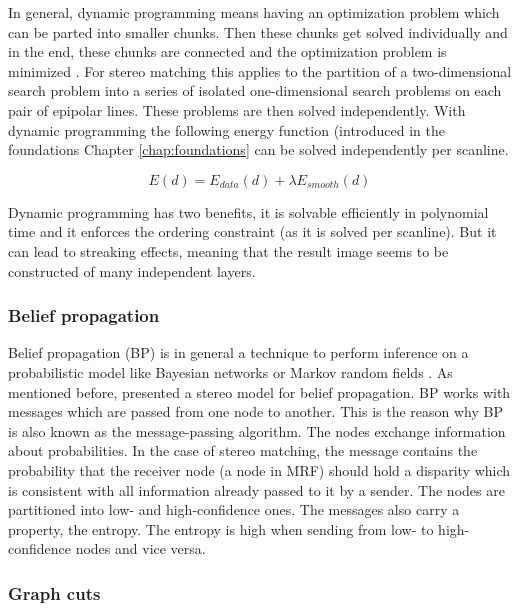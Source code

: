 In general, dynamic programming means having an optimization problem which can be parted into smaller chunks.
Then these chunks get solved individually and in the end, these chunks are connected and the optimization problem is minimized \citep{angel1972dynamic, bellman2015applied, cyganek2011introduction}.
For stereo matching this applies to the partition of a two-dimensional search problem into a series of isolated one-dimensional search problems on each pair of epipolar lines.
These problems are then solved independently.
With dynamic programming the following energy function (introduced in the foundations Chapter \ref{chap:foundations} can be solved independently per scanline.

\begin{equation}
  E(d) = E_{data}(d) + \lambda E_{smooth}(d)
\end{equation}

\noindent Dynamic programming has two benefits, it is solvable efficiently in polynomial time and it enforces the ordering constraint (as it is solved per scanline).
But it can lead to streaking effects, meaning that the result image seems to be constructed of many independent layers.

\subsubsection{Belief propagation}

Belief propagation (BP) is in general a technique to perform inference on a probabilistic model like Bayesian networks or Markov random fields \citep{yedidia2003understanding, tappen2003comparison, cyganek2011introduction}.
As mentioned before, \citeauthor{sun2003stereo} presented a stereo model for belief propagation.
BP works with messages which are passed from one node to another.
This is the reason why BP is also known as the message-passing algorithm.
The nodes exchange information about probabilities.
In the case of stereo matching, the message contains the probability that the receiver node (a node in MRF) should hold a disparity which is consistent with all information already passed to it by a sender.
The nodes are partitioned into low- and high-confidence ones.
The messages also carry a property, the entropy.
The entropy is high when sending from low- to high-confidence nodes and vice versa.

\subsubsection{Graph cuts}

